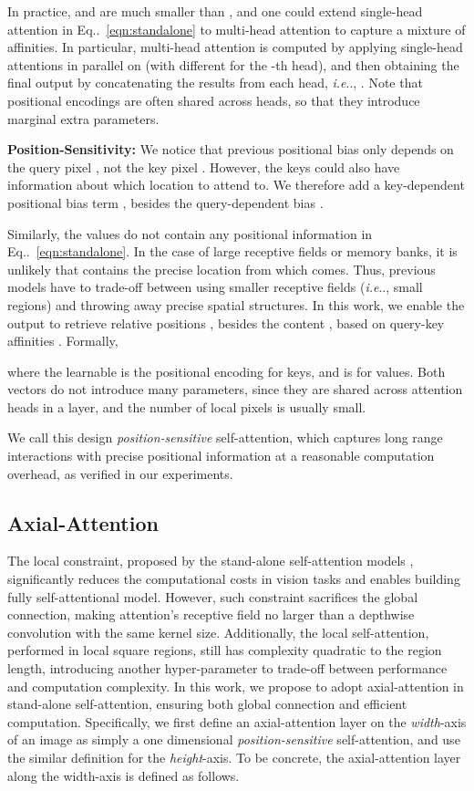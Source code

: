 \documentclass[runningheads]{llncs}
\makeatletter
\DeclareRobustCommand\onedot{\futurelet\@let@token\@onedot}
\def\@onedot{\ifx\@let@token.\else.\null\fi\xspace}
\def\ie{\emph{i.e}\onedot} \def\Ie{\emph{I.e}\onedot}
\newcommand{\equref}[1]{Eq\onedot~\eqref{#1}}
\makeatother
\begin{document}
In practice,  and  are much smaller than , and one could extend single-head attention in \equref{eqn:standalone} to multi-head attention to capture a mixture of affinities. In particular, multi-head attention is computed by applying  single-head attentions in parallel on  (with different  for the -th head), and then obtaining the final output  by concatenating the results from each head, \ie, . Note that positional encodings are often shared across heads, so that they introduce marginal extra parameters.

{\bf Position-Sensitivity:} We notice that previous positional bias only depends on the query pixel , not the key pixel . However, the keys  could also have information about which location to attend to. We therefore add a key-dependent positional bias term , besides the query-dependent bias .

Similarly, the values  do not contain any positional information in \equref{eqn:standalone}. In the case of large receptive fields or memory banks, it is unlikely that  contains the precise location from which  comes. Thus, previous models have to trade-off between using smaller receptive fields (\ie, small  regions) and throwing away precise spatial structures. In this work, we enable the output  to retrieve relative positions , besides the content , based on query-key affinities . Formally,

where the learnable  is the positional encoding for keys, and  is for values. Both vectors do not introduce many parameters, since they are shared across attention heads in a layer, and the number of local pixels  is usually small.

We call this design {\it position-sensitive} self-attention, which captures long range interactions with precise positional information at a reasonable computation overhead, as verified in our experiments.

\subsection{Axial-Attention}

The local constraint, proposed by the stand-alone self-attention models \cite{parmar2019stand}, significantly reduces the computational costs in vision tasks and enables building fully self-attentional model. However, such constraint sacrifices the global connection, making attention's receptive field no larger than a depthwise convolution with the same kernel size. Additionally, the local self-attention, performed in local square regions, still has complexity quadratic to the region length, introducing another hyper-parameter to trade-off between performance and computation complexity. In this work, we propose to adopt axial-attention \cite{huang2019ccnet,ho2019axial} in stand-alone self-attention, ensuring both global connection and efficient computation. Specifically, we first define an axial-attention layer on the {\it width}-axis of an image as simply a one dimensional {\it position-sensitive} self-attention, and use the similar definition for the {\it height}-axis. To be concrete, the axial-attention layer along the width-axis is defined as follows.
\end{document}
